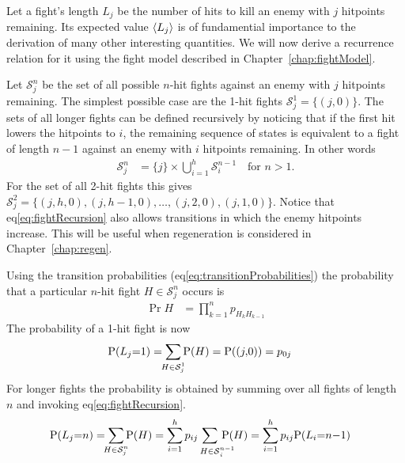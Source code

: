 Let a fight's length $L_j$ be the number of hits to kill an enemy with $j$ hitpoints remaining. Its expected value $\left\langle L_j \right\rangle$ is of fundamential importance to the derivation of many other interesting quantities. We will now derive a recurrence relation for it using the fight model described in Chapter~\ref{chap:fightModel}.

Let $\mathcal{S}_j^n$ be the set of all possible $n$-hit fights against an enemy with $j$ hitpoints remaining. The simplest possible case are the 1-hit fights $\mathcal{S}_j^1 = \{(j,0)\}$. The sets of all longer fights can be defined recursively by noticing that if the first hit lowers the hitpoints to $i$, the remaining sequence of states is equivalent to a fight of length $n-1$ against an enemy with $i$ hitpoints remaining. In other words
\begin{align}
	\mathcal{S}_j^n &=  \{j\} \times \bigcup_{i=1}^h \mathcal{S}_i^{n-1} \quad \mbox{for } n>1.\label{eq:fightRecursion}
\end{align}
For the set of all 2-hit fights this gives $\mathcal{S}_j^2 = \{(j,h,0), (j,h-1,0), \ldots, (j,2,0), (j,1,0)\}$. Notice that eq\ref{eq:fightRecursion} also allows transitions in which the enemy hitpoints increase. This will be useful when regeneration is considered in Chapter~\ref{chap:regen}.

Using the transition probabilities (eq\ref{eq:transitionProbabilities}) the probability that a particular $n$-hit fight $H \in \mathcal{S}_{j}^n$ occurs is
\begin{align}
    \Pr{H} &= \prod_{k=1}^{n} p_{H_{k} H_{k-1}}
\end{align}
The probability of a 1-hit fight is now
\begin{align}\label{eq:probabilityRecursion1hit}
    \Pr{L_j = 1} &= \sum_{\mathclap{H \in \mathcal{S}_j^1}}\Pr{H}
            = \Pr{(j,0}) = p_{0j}
\end{align}
For longer fights the probability is obtained by summing over all fights of length $n$ and invoking eq\ref{eq:fightRecursion}.
\begin{align}\label{eq:probabilityRecursion}
    \Pr{L_j = n} &= \sum_{\mathclap{H \in \mathcal{S}_j^n}}\Pr{H}
            = \sum_{i=1}^h p_{ij} \sum_{H \in \mathcal{S}\mathrlap{_i^{n-1}}}\Pr{H}
            = \sum_{i=1}^h p_{ij} \Pr{L_i = n-1}
\end{align}

